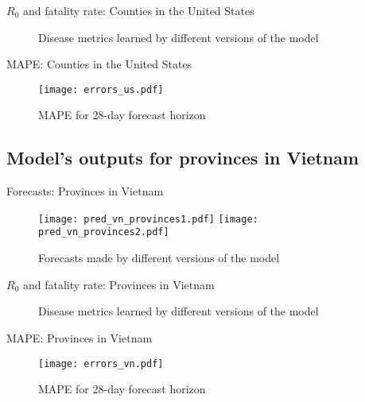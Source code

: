 \begin{frame}{$R_0$ and fatality rate: Counties in the United States}
    \begin{figure}[!htb]
        \centering
        \caption{Disease metrics learned by different versions of the model}
    \end{figure}
\end{frame}

\begin{frame}{MAPE: Counties in the United States}
    \begin{figure}[h]
        \centering
        \texttt{[image: errors\_us.pdf]}
        \caption{MAPE for 28-day forecast horizon}
    \end{figure}
\end{frame}

\subsection{Model's outputs for provinces in Vietnam}

\begin{frame}{Forecasts: Provinces in Vietnam}
    \begin{figure}[!htb]
        \centering
        \texttt{[image: pred\_vn\_provinces1.pdf]}
        \texttt{[image: pred\_vn\_provinces2.pdf]}
        \caption{Forecasts made by different versions of the model}
    \end{figure}
\end{frame}

\begin{frame}{$R_0$ and fatality rate: Provinces in Vietnam}
    \begin{figure}[!htb]
        \centering
        \caption{Disease metrics learned by different versions of the model}
    \end{figure}
\end{frame}

\begin{frame}{MAPE: Provinces in Vietnam}
    \begin{figure}[h]
        \centering
        \texttt{[image: errors\_vn.pdf]}
        \caption{MAPE for 28-day forecast horizon}
    \end{figure}
\end{frame}